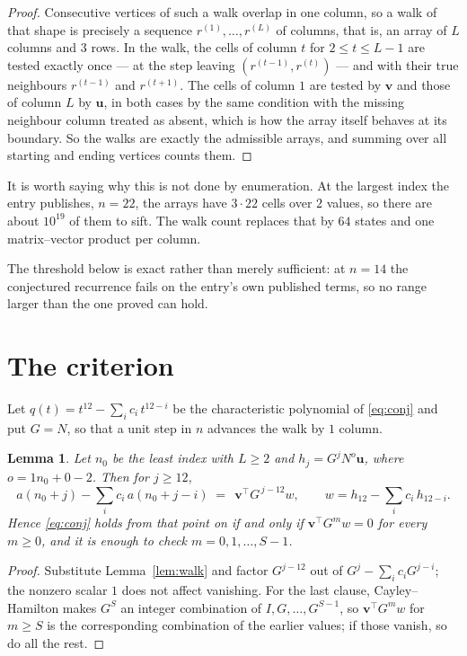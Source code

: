 \documentclass[11pt,a4paper]{article}
\theoremstyle{plain}
\newtheorem{lemma}[theorem]{Lemma}
\theoremstyle{definition}
\begin{document}
\begin{proof}
Consecutive vertices of such a walk overlap in one column, so a walk of that shape is
precisely a sequence $r^{(1)},\dots,r^{(L)}$ of columns, that is, an array of $L$ columns
and $3$ rows. In the walk, the cells of column $t$ for $2\le t\le L-1$ are tested
exactly once --- at the step leaving $(r^{(t-1)},r^{(t)})$ --- and with their true
neighbours $r^{(t-1)}$ and $r^{(t+1)}$. The cells of column $1$ are tested by
$\mathbf{v}$ and those of column $L$ by $\mathbf{u}$, in both cases by the same condition
with the missing neighbour column treated as absent, which is how the array itself behaves at
its boundary. So the walks are exactly the admissible arrays, and summing over all starting
and ending vertices counts them.
\end{proof}


It is worth saying why this is not done by enumeration. At the largest index the entry
publishes, $n=22$, the arrays have $3\cdot22$ cells over
$2$ values, so there are about $10^{19}$ of them to sift. The
walk count replaces that by $64$ states and one matrix--vector product per column.

The threshold below is exact rather than merely sufficient: at $n=14$ the conjectured
recurrence fails on the entry's own published terms, so no range larger than the one proved
can hold.
\section{The criterion}

Let $q(t)=t^{12}-\sum_i c_i\,t^{12-i}$ be the characteristic polynomial of
\eqref{eq:conj} and put $G=N$, so that a unit step in $n$ advances the walk by
$1$ column.

\begin{lemma}\label{lem:crit}
Let $n_0$ be the least index with $L\ge2$ and $h_j=G^{j}N^{o}\mathbf{u}$, where
$o=1n_0+0-2$. Then for $j\ge12$,
\[
a(n_0+j)-\sum_i c_i\,a(n_0+j-i)\;=\;\,\mathbf{v}^{\!\top}G^{\,j-12}w,
\qquad w=h_{12}-\sum_i c_i\,h_{12-i} .
\]
Hence \eqref{eq:conj} holds from that point on if and only if
$\mathbf{v}^{\!\top}G^{m}w=0$ for every $m\ge0$, and it is enough to check
$m=0,1,\dots,S-1$.
\end{lemma}

\begin{proof}
Substitute Lemma~\ref{lem:walk} and factor $G^{j-12}$ out of
$G^{j}-\sum_ic_iG^{j-i}$; the nonzero scalar $1$ does not affect
vanishing. For the last clause, Cayley--Hamilton makes $G^{S}$ an integer combination of
$I,G,\dots,G^{S-1}$, so $\mathbf{v}^{\!\top}G^{m}w$ for $m\ge S$ is the corresponding
combination of the earlier values; if those vanish, so do all the rest.
\end{proof}
\end{document}
